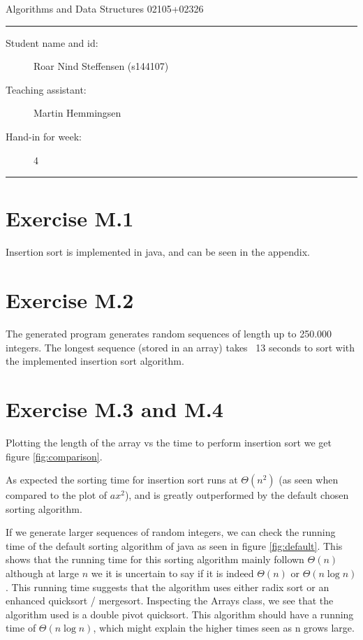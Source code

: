 \documentclass[11pt]{article}
\begin{document}
\begin{center}
{{\Large \sc Algorithms and Data Structures 02105+02326}}
\end{center}
\rule{\textwidth}{1pt}
\begin{description}
\item[Student name and id:] Roar Nind Steffensen (s144107)
\item[Teaching assistant:] Martin Hemmingsen
\item[Hand-in for week:] 4
\end{description}
\rule{\textwidth}{1pt}
 

\section*{Exercise M.1}

Insertion sort is implemented in java, and can be seen in the appendix.

\section*{Exercise M.2}

The generated program generates random sequences of length up to 250.000 integers.
The longest sequence (stored in an array) takes ~13 seconds to sort with the implemented insertion sort algorithm.

\section*{Exercise M.3 and M.4}

Plotting the length of the array vs the time to perform insertion sort we get figure \ref{fig:comparison}.

As expected the sorting time for insertion sort runs at $\Theta(n^2)$ (as seen when compared to the plot of $ax^2$), and is greatly outperformed by the default chosen sorting algorithm.

If we generate larger sequences of random integers, we can check the running time of the default sorting algorithm of java as seen in figure \ref{fig:default}. This shows that the running time for this sorting algorithm mainly follown $\Theta(n)$ although at large $n$ we it is uncertain to say if it is indeed $\Theta(n)$ or $\Theta(n \log n)$. This running time suggests that the algorithm uses either radix sort or an enhanced quicksort / mergesort. Inspecting the Arrays class, we see that the algorithm used is a double pivot quicksort. This algorithm should have a running time of $\Theta(n \log n)$, which might explain the higher times seen as n grows large.
\end{document}
